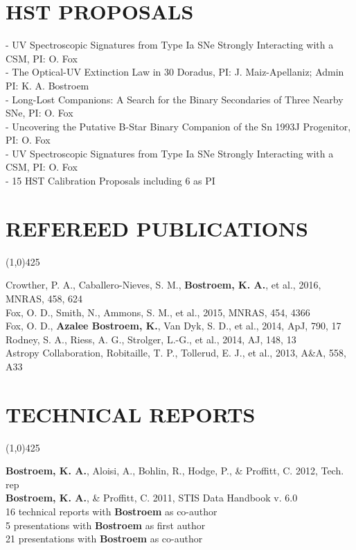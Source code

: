 \documentclass{res}
\begin{document}
\begin{resume}
\section{HST PROPOSALS}
- UV Spectroscopic Signatures from Type Ia SNe Strongly Interacting with a CSM, PI: O. Fox \\
- The Optical-UV Extinction Law in 30 Doradus, PI: J. Maiz-Apellaniz; Admin PI: K. A. Bostroem \\
- Long-Lost Companions: A Search for the Binary Secondaries of Three Nearby SNe, PI: O. Fox \\
- Uncovering the Putative B-Star Binary Companion of the Sn 1993J Progenitor, PI: O. Fox\\
- UV Spectroscopic Signatures from Type Ia SNe Strongly Interacting with a CSM, PI: O. Fox \\
- 15 HST Calibration Proposals including 6 as PI


\section{REFEREED PUBLICATIONS}
\vspace{-.2in} 
\begin{center}
\line(1,0){425}
\end{center}
\vspace{-.25in} 
\vspace{0.1in}
Crowther, P. A., Caballero-Nieves, S. M., {\bf Bostroem, K. A.}, et al., 2016, MNRAS, 458, 624\\
Fox, O. D., Smith, N., Ammons, S. M., et al., 2015, MNRAS, 454, 4366\\
Fox, O. D., {\bf Azalee Bostroem, K.}, Van Dyk, S. D., et al., 2014, ApJ, 790, 17\\
Rodney, S. A., Riess, A. G., Strolger, L.-G., et al., 2014, AJ, 148, 13\\
Astropy Collaboration, Robitaille, T. P., Tollerud, E. J., et al., 2013, A\&A, 558, A33 \\

\section{TECHNICAL REPORTS}
\vspace{-.2in} 
\begin{center}
\line(1,0){425}
\end{center}
\vspace{-.25in} 
\vspace{0.1in}
{\bf Bostroem, K. A.}, Aloisi, A., Bohlin, R., Hodge, P., \& Proffitt, C. 2012, Tech. rep \\
{\bf Bostroem, K. A.}, \& Proffitt, C. 2011, STIS Data Handbook v. 6.0\\
16 technical reports with {\bf Bostroem} as co-author \\
5 presentations with {\bf Bostroem} as first author \\
21 presentations with {\bf Bostroem} as co-author \\


\end{resume}
\end{document}
